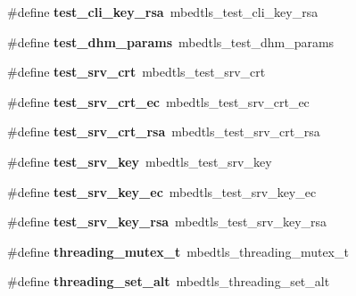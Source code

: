 \begin{DoxyCompactItemize}
\#define {\bfseries test\+\_\+cli\+\_\+key\+\_\+rsa}~mbedtls\+\_\+test\+\_\+cli\+\_\+key\+\_\+rsa
\item 
\mbox{\label{compat-1_83_8h_a84c81dbefeecc274e17153a2f41033b8}} 
\#define {\bfseries test\+\_\+dhm\+\_\+params}~mbedtls\+\_\+test\+\_\+dhm\+\_\+params
\item 
\mbox{\label{compat-1_83_8h_a08fb570c1e3ed022958d4dc37b81acaa}} 
\#define {\bfseries test\+\_\+srv\+\_\+crt}~mbedtls\+\_\+test\+\_\+srv\+\_\+crt
\item 
\mbox{\label{compat-1_83_8h_a4fb413106fbdc0e5b8010afaf9c5b29f}} 
\#define {\bfseries test\+\_\+srv\+\_\+crt\+\_\+ec}~mbedtls\+\_\+test\+\_\+srv\+\_\+crt\+\_\+ec
\item 
\mbox{\label{compat-1_83_8h_af750059aa45bf2a0048eada5107fa622}} 
\#define {\bfseries test\+\_\+srv\+\_\+crt\+\_\+rsa}~mbedtls\+\_\+test\+\_\+srv\+\_\+crt\+\_\+rsa
\item 
\mbox{\label{compat-1_83_8h_ad6b27d97c583610e3d5567f3f00f9060}} 
\#define {\bfseries test\+\_\+srv\+\_\+key}~mbedtls\+\_\+test\+\_\+srv\+\_\+key
\item 
\mbox{\label{compat-1_83_8h_af726754c9792c5a6400fc13132a4334b}} 
\#define {\bfseries test\+\_\+srv\+\_\+key\+\_\+ec}~mbedtls\+\_\+test\+\_\+srv\+\_\+key\+\_\+ec
\item 
\mbox{\label{compat-1_83_8h_a23870332d47f392a81f2ee7fca45ec03}} 
\#define {\bfseries test\+\_\+srv\+\_\+key\+\_\+rsa}~mbedtls\+\_\+test\+\_\+srv\+\_\+key\+\_\+rsa
\item 
\mbox{\label{compat-1_83_8h_aabe46e83dcbbe30dd4ca9c53c82e5493}} 
\#define {\bfseries threading\+\_\+mutex\+\_\+t}~mbedtls\+\_\+threading\+\_\+mutex\+\_\+t
\item 
\mbox{\label{compat-1_83_8h_a9ceaca45f3c3f4ce7e306e03bf226755}} 
\#define {\bfseries threading\+\_\+set\+\_\+alt}~mbedtls\+\_\+threading\+\_\+set\+\_\+alt
\item 
\mbox{\label{compat-1_83_8h_a08fcd4b1b245ec91d84571d657cea1ef}} 

\end{DoxyCompactItemize}
